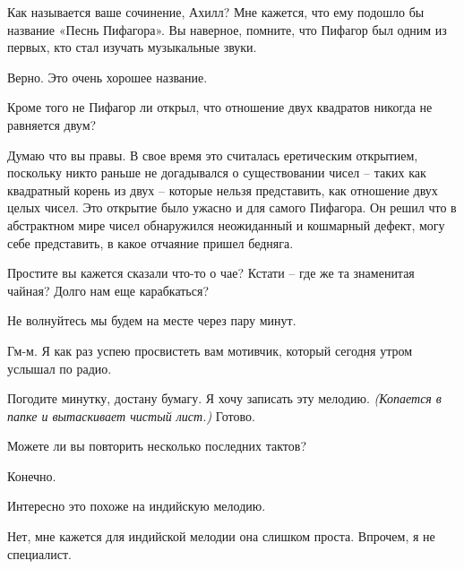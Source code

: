 \documentclass[../main.tex]{subfiles}
\begin{document}
\begin{dialogue}
 Как называется ваше сочинение, Ахилл? Мне кажется, что ему подошло бы название «Песнь Пифагора». Вы наверное, помните, что Пифагор был одним из первых, кто стал изучать музыкальные звуки.

 Верно. Это очень хорошее название.

 Кроме того не Пифагор ли открыл, что отношение двух квадратов никогда не равняется двум?

 Думаю что вы правы. В свое время это считалась еретическим открытием, поскольку никто раньше не догадывался о существовании чисел \--- таких как квадратный корень из двух \--- которые нельзя представить, как отношение двух целых чисел. Это открытие было ужасно и для самого Пифагора. Он решил что в абстрактном мире чисел обнаружился неожиданный и кошмарный дефект, могу себе представить, в какое отчаяние пришел бедняга.

 Простите вы кажется сказали что-то о чае? Кстати \--- где же та знаменитая чайная? Долго нам еще карабкаться?

 Не волнуйтесь мы будем на месте через пару минут.

 Гм-м. Я как раз успею просвистеть вам мотивчик, который сегодня утром услышал по радио.

 Погодите минутку, достану бумагу. Я хочу записать эту мелодию. \emph{(Копается в папке и вытаскивает чистый лист.)} Готово.


Можете ли вы повторить несколько последних тактов?

 Конечно.


 Интересно это похоже на индийскую мелодию.

 Нет, мне кажется для индийской мелодии она слишком проста. Впрочем, я не специалист.


\end{dialogue}
\end{document}

